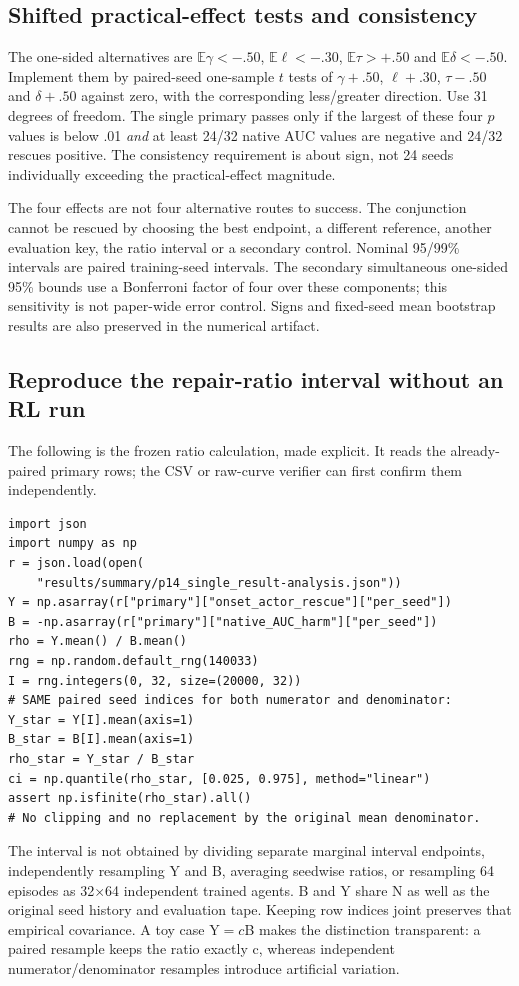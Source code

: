 \subsection{Shifted practical-effect tests and consistency}
The one-sided alternatives are $\mathbb E\gamma<-.50$, $\mathbb E\ell<-.30$, $\mathbb E\tau>+.50$ and $\mathbb E\delta<-.50$. Implement them by paired-seed one-sample $t$ tests of $\gamma+.50$, $\ell+.30$, $\tau-.50$ and $\delta+.50$ against zero, with the corresponding less/greater direction. Use 31 degrees of freedom. The single primary passes only if the largest of these four $p$ values is below .01 \emph{and} at least 24/32 native AUC values are negative and 24/32 rescues positive. The consistency requirement is about sign, not 24 seeds individually exceeding the practical-effect magnitude.

The four effects are not four alternative routes to success. The conjunction cannot be rescued by choosing the best endpoint, a different reference, another evaluation key, the ratio interval or a secondary control. Nominal 95/99\% intervals are paired training-seed intervals. The secondary simultaneous one-sided 95\% bounds use a Bonferroni factor of four over these components; this sensitivity is not paper-wide error control. Signs and fixed-seed mean bootstrap results are also preserved in the numerical artifact.

\subsection{Reproduce the repair-ratio interval without an RL run}
The following is the frozen ratio calculation, made explicit. It reads the already-paired primary rows; the CSV or raw-curve verifier can first confirm them independently.
\begin{verbatim}
import json
import numpy as np
r = json.load(open(
    "results/summary/p14_single_result-analysis.json"))
Y = np.asarray(r["primary"]["onset_actor_rescue"]["per_seed"])
B = -np.asarray(r["primary"]["native_AUC_harm"]["per_seed"])
rho = Y.mean() / B.mean()
rng = np.random.default_rng(140033)
I = rng.integers(0, 32, size=(20000, 32))
# SAME paired seed indices for both numerator and denominator:
Y_star = Y[I].mean(axis=1)
B_star = B[I].mean(axis=1)
rho_star = Y_star / B_star
ci = np.quantile(rho_star, [0.025, 0.975], method="linear")
assert np.isfinite(rho_star).all()
# No clipping and no replacement by the original mean denominator.
\end{verbatim}
The interval is not obtained by dividing separate marginal interval endpoints, independently resampling Y and B, averaging seedwise ratios, or resampling 64 episodes as 32$\times$64 independent trained agents. B and Y share N as well as the original seed history and evaluation tape. Keeping row indices joint preserves that empirical covariance. A toy case Y$=c$B makes the distinction transparent: a paired resample keeps the ratio exactly c, whereas independent numerator/denominator resamples introduce artificial variation.

